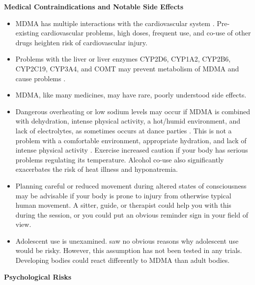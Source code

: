 \documentclass[12pt,letterpaper]{article}
\begin{document}
\noindent \textbf{Medical Contraindications and Notable Side Effects}
\begin{itemize}
    \item MDMA has multiple interactions with the cardiovascular system \cite{bonsignoreCardio}. Pre-existing cardiovascular problems, high doses, frequent use, and co-use of other drugs heighten risk of cardiovascular injury. 
    \item Problems with the liver or liver enzymes CYP2D6, CYP1A2, CYP2B6, CYP2C19, CYP3A4, and COMT may prevent metabolism of MDMA and cause problems \cite{torreEnzymes}.
    \item MDMA, like many medicines, may have rare, poorly understood side effects.
    \item Dangerous overheating or low sodium levels may occur if MDMA is combined with dehydration, intense physical activity, a hot/humid environment, and lack of electrolytes, as sometimes occurs at dance parties \cite{vanOverheatingAlcohol}. This is not a problem with a comfortable environment, appropriate hydration, and lack of intense physical activity \cite{mitchellMDMAClinicalTrial}. Exercise increased caution if your body has serious problems regulating its temperature. Alcohol co-use also significantly exacerbates the risk of heat illness and hyponatremia.
    \item Planning careful or reduced movement during altered states of consciousness may be advisable if your body is prone to injury from otherwise typical human movement. A sitter, guide, or therapist could help you with this during the session, or you could put an obvious reminder sign in your field of view. 
    \item Adolescent use is unexamined. \textcite{kangaslampiAdolescent} saw no obvious reasons why adolescent use would be risky. However, this assumption has not been tested in any trials. Developing bodies could react differently to MDMA than adult bodies.
\end{itemize}
\noindent \textbf{Psychological Risks}
\end{document}

